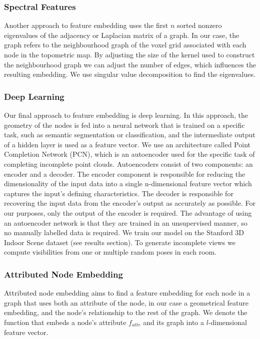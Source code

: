 \subsubsection{Spectral Features}
Another approach to feature embedding uses the first \(n\) sorted nonzero eigenvalues of the adjacency or Laplacian matrix of a graph. In our case, the graph refers to the neighbourhood graph of the voxel grid associated with each node in the topometric map. By adjusting the size of the kernel used to construct the neighbourhood graph we can adjust the number of edges, which influences the resulting embedding. We use singular value decomposition to find the eigenvalues.

\subsubsection{Deep Learning}
Our final approach to feature embedding is deep learning. In this approach, the geometry of the nodes is fed into a neural network that is trained on a specific task, such as semantic segmentation or classification, and the intermediate output of a hidden layer is used as a feature vector. We use an architecture called Point Completion Network (PCN), which is an autoencoder used for the specific task of completing incomplete point clouds. Autoencoders consist of two components: an encoder and a decoder. The encoder component is responsible for reducing the dimensionality of the input data into a single n-dimensional feature vector which captures the input's defining characteristics. The decoder is responsible for recovering the input data from the encoder's output as accurately as possible. For our purposes, only the output of the encoder is required. The advantage of using an autoencoder network is that they are trained in an unsupervised manner, so no manually labelled data is required. We train our model on the Stanford 3D Indoor Scene dataset (see results section). To generate incomplete views we compute visibilities from one or multiple random poses in each room.

\subsubsection{Attributed Node Embedding}
Attributed node embedding aims to find a feature embedding for each node in a graph that uses both an attribute of the node, in our case a geometrical feature embedding, and the node's relationship to the rest of the graph. We denote the function that embeds a node's attribute \(f_{attr}\) and its graph into a \(l\)-dimensional feature vector.


